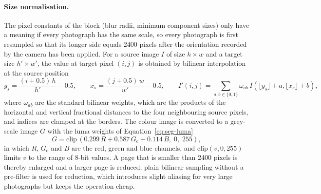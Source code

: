 \paragraph{Size normalisation.}
The pixel constants of the block (blur radii, minimum component sizes) only have a meaning if every photograph has the same scale, so every photograph is first resampled so that its longer side equals 2400 pixels after the orientation recorded by the camera has been applied.
For a source image $I$ of size $h\times w$ and a target size $h'\times w'$, the value at target pixel $(i,j)$ is obtained by bilinear interpolation at the source position
\begin{equation}
y_s=\frac{(i+0.5)\,h}{h'}-0.5,\qquad x_s=\frac{(j+0.5)\,w}{w'}-0.5,\qquad I'(i,j)=\sum_{a,b\in\{0,1\}}\omega_{ab}\,I(\lfloor y_s\rfloor+a,\lfloor x_s\rfloor+b),
\label{eq:seg-resize}
\end{equation}
where $\omega_{ab}$ are the standard bilinear weights, which are the products of the horizontal and vertical fractional distances to the four neighbouring source pixels, and indices are clamped at the borders.
The colour image is converted to a grey-scale image $G$ with the luma weights of Equation~\ref{eq:seg-luma}
\begin{equation}
G=\mathrm{clip}\,(0.299\,R+0.587\,G_{\mathrm{c}}+0.114\,B,\;0,\;255),
\label{eq:seg-luma}
\end{equation}
in which $R$, $G_{\mathrm c}$ and $B$ are the red, green and blue channels, and $\mathrm{clip}(v,0,255)$ limits $v$ to the range of 8-bit values.
A page that is smaller than 2400 pixels is thereby enlarged and a larger page is reduced; plain bilinear sampling without a pre-filter is used for reduction, which introduces slight aliasing for very large photographs but keeps the operation cheap.


